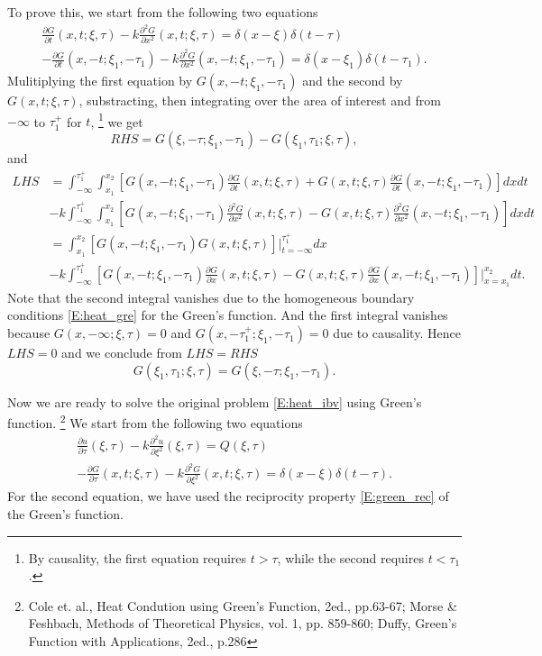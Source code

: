 To prove this, we start from the following two equations
\begin{align*}
  \frac{\partial G}{\partial t}(x,t;\xi,\tau) 
    - k \frac{\partial^2 G}{\partial x^2}(x,t;\xi,\tau) 
    = \delta(x-\xi)\delta(t-\tau) \\
  -\frac{\partial G}{\partial t}(x,-t;\xi_1,-\tau_1) 
    - k \frac{\partial^2 G}{\partial x^2}(x,-t;\xi_1,-\tau_1) 
    = \delta(x-\xi_1)\delta(t-\tau_1).
\end{align*}
Mulitiplying the first equation by $G(x,-t;\xi_1,-\tau_1)$ and the second by
$G(x,t;\xi,\tau)$, substracting, then integrating over the area of interest and
from $-\infty$ to $\tau_1^+$ for $t$, 
\footnote{By causality, the first equation requires $t>\tau$, while the second
  requires $t<\tau_1$.}
we get
\[
  RHS = G(\xi,-\tau;\xi_1,-\tau_1) - G(\xi_1,\tau_1;\xi,\tau),
\]
and
\begin{align*}
  LHS &= \int_{-\infty}^{\tau_1^+} \int_{x_1}^{x_2}
         \left[
           G(x,-t;\xi_1,-\tau_1)\frac{\partial G}{\partial t}(x,t;\xi,\tau)
          + G(x,t;\xi,\tau)\frac{\partial G}{\partial t}(x,-t;\xi_1,-\tau_1)
         \right] dx dt  \\
     &- k \int_{-\infty}^{\tau_1^+} \int_{x_1}^{x_2}
         \left[
           G(x,-t;\xi_1,-\tau_1)\frac{\partial^2 G}{\partial x^2}(x,t;\xi,\tau)
          - G(x,t;\xi,\tau)\frac{\partial^2 G}{\partial x^2}(x,-t;\xi_1,-\tau_1)
         \right] dx dt  \\
     &= \int_{x_1}^{x_2} \left[ G(x,-t;\xi_1,-\tau_1) G(x,t;\xi,\tau) \right]
        \bigg\rvert_{t=-\infty}^{\tau_1^+} dx \\
     &- k \int_{-\infty}^{\tau_1^+} 
         \left[
           G(x,-t;\xi_1,-\tau_1)\frac{\partial G}{\partial x}(x,t;\xi,\tau)
          - G(x,t;\xi,\tau)\frac{\partial G}{\partial x}(x,-t;\xi_1,-\tau_1)
         \right] \bigg\rvert_{x=x_1}^{x_2} dt.
\end{align*}
Note that the second integral vanishes due to the homogeneous boundary
conditions \ref{E:heat_gre} for the Green's function. And the first integral
vanishes because $G(x,-\infty;\xi,\tau)=0$ and $G(x,-\tau_1^+;\xi_1,-\tau_1)=0$
due to causality. Hence $LHS=0$ and we conclude from $LHS=RHS$
\[
  G(\xi_1,\tau_1;\xi,\tau) = G(\xi,-\tau;\xi_1,-\tau_1).
\]

Now we are ready to solve the original problem \ref{E:heat_ibv} using Green's
function. 
\footnote{Cole et. al., Heat Condution using Green's Function, 2ed., pp.63-67;
  Morse \& Feshbach, Methods of Theoretical Physics, vol. 1, pp. 859-860;
  Duffy, Green's Function with Applications, 2ed., p.286}
We start from the following two equations
\begin{align*}
  \frac{\partial u}{\partial \tau}(\xi,\tau) 
    - k \frac{\partial^2 u}{\partial \xi^2}(\xi,\tau) = Q(\xi,\tau) \\
  - \frac{\partial G}{\partial \tau}(x,t;\xi,\tau) 
    - k \frac{\partial^2 G}{\partial \xi^2}(x,t;\xi,\tau) 
    = \delta(x-\xi)\delta(t-\tau). 
\end{align*}
For the second equation, we have used the reciprocity property \ref{E:green_rec}
of the Green's function.

